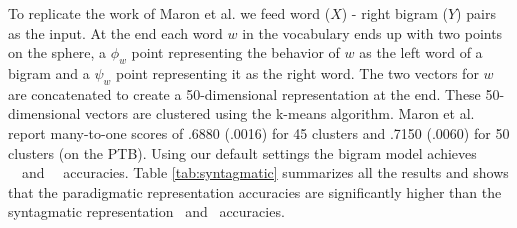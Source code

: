 To replicate the work of Maron et al.  we
feed word ($X$) - right bigram ($Y$) pairs as the input.  At the end
each word $w$ in the vocabulary ends up with two points on the sphere,
a $\phi_w$ point representing the behavior of $w$ as the left word of
a bigram and a $\psi_w$ point representing it as the right word.  The
two vectors for $w$ are concatenated to create a 50-dimensional
representation at the end.  These 50-dimensional vectors are clustered
using the k-means algorithm.  Maron et al. 
report many-to-one scores of .6880 (.0016) for 45 clusters and .7150
(.0060) for 50 clusters (on the PTB).  Using our default settings the
bigram model achieves \bgmto\ \mto\ and \bgvm\ \vm\ accuracies.  Table
\ref{tab:syntagmatic} summarizes all the results and shows that the
paradigmatic representation accuracies are significantly higher than
the syntagmatic representation \mto\ and \vm\ accuracies.

